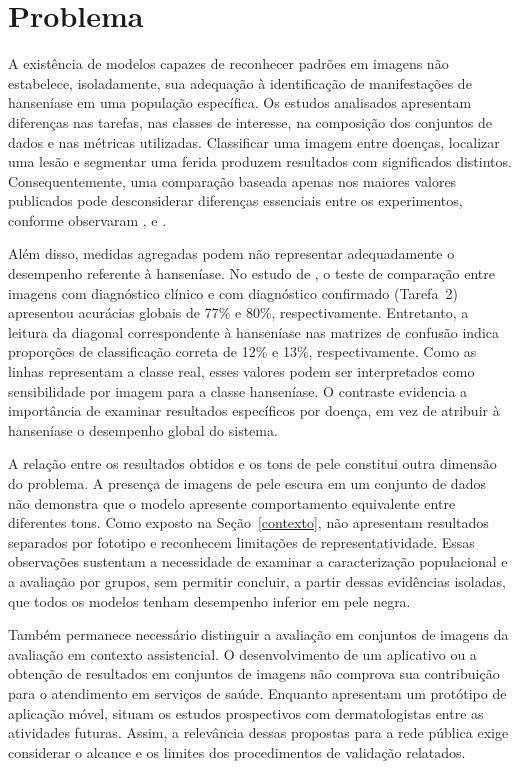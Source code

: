\section{Problema}\label{problema}

A existência de modelos capazes de reconhecer padrões em imagens não
estabelece, isoladamente, sua adequação à identificação de manifestações
de hanseníase em uma população específica. Os estudos analisados
apresentam diferenças nas tarefas, nas classes de interesse, na
composição dos conjuntos de dados e nas métricas utilizadas. Classificar
uma imagem entre doenças, localizar uma lesão e segmentar uma ferida
produzem resultados com significados distintos. Consequentemente, uma
comparação baseada apenas nos maiores valores publicados pode
desconsiderar diferenças essenciais entre os experimentos, conforme observaram
,  e .

Além disso, medidas agregadas podem não representar adequadamente o
desempenho referente à hanseníase. No estudo de , o teste de
comparação entre imagens com diagnóstico clínico e com diagnóstico confirmado
(Tarefa~2) apresentou acurácias globais de 77\% e 80\%, respectivamente. Entretanto, a leitura da diagonal correspondente à hanseníase
nas matrizes de confusão indica proporções de classificação correta de
12\% e 13\%, respectivamente. Como as linhas representam a classe real,
esses valores podem ser interpretados como sensibilidade por imagem para
a classe hanseníase. O contraste evidencia a importância de examinar
resultados específicos por doença, em vez de atribuir à hanseníase o
desempenho global do sistema.

A relação entre os resultados obtidos e os tons de pele constitui outra
dimensão do problema. A presença de imagens de pele escura em um
conjunto de dados não demonstra que o modelo apresente comportamento
equivalente entre diferentes tons. Como exposto na Seção~\ref{contexto},
 não apresentam resultados separados por fototipo e
 reconhecem limitações de representatividade. Essas observações sustentam a necessidade de
examinar a caracterização populacional e a avaliação por grupos, sem
permitir concluir, a partir dessas evidências isoladas, que todos os
modelos tenham desempenho inferior em pele negra.

Também permanece necessário distinguir a avaliação em conjuntos de imagens
da avaliação em contexto assistencial. O desenvolvimento de um aplicativo
ou a obtenção de resultados em conjuntos de imagens não comprova sua
contribuição para o atendimento em serviços de saúde. Enquanto
 apresentam um protótipo de
aplicação móvel,  situam os estudos prospectivos com
dermatologistas entre as atividades futuras. Assim, a relevância dessas
propostas para a rede pública exige considerar o alcance e os limites
dos procedimentos de validação relatados.

